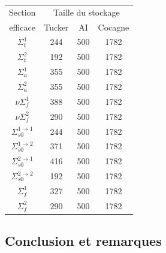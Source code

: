 \begin{center}
\begin{table}
\begin{tabular}{|*{4}{c|}}
	\hline
	Section              						& \multicolumn{3}{|c|}{Taille du stockage} 		\\
	\cline{2-4}
	efficace				 								& Tucker  			& AI 					 	& Cocagne 		\\
	\hline
	$\Sigma_t^1$ 			 							& 244 						& 500 		 		& 	1782			\\
	\hline
	$\Sigma_t^2$ 			 							& 192 						& 500 		 		& 	1782			\\
	\hline
	$\Sigma_a^1$ 			 							& 355 						& 500 		 		& 	1782			\\
	\hline
	$\Sigma_a^2$ 			 							& 355 						& 500 		 		& 	1782			\\
	\hline
	$\nu \Sigma_f^1$ 			 					& 388 						& 500 		 		& 	1782			\\
	\hline
	$\nu \Sigma_f^2$ 			 					& 290 						& 500 		 		& 	1782			\\
	\hline
	$\Sigma_{s0}^{1\rightarrow1}$ 	& 244 						& 500 		 		& 	1782			\\
	\hline
	$\Sigma_{s0}^{1\rightarrow2}$		& 371 						& 500 		 		& 	1782			\\
	\hline
	$\Sigma_{s0}^{2\rightarrow1}$ 	& 416 						& 500 		 		& 	1782			\\
	\hline
	$\Sigma_{s0}^{2\rightarrow2}$		& 192 						& 500 		 		& 	1782			\\
	\hline
	$\Sigma_f^1$ 			 							& 327 						& 500 		 		& 	1782			\\
	\hline
	$\Sigma_f^2$ 			 							& 290 						& 500 		 		& 	1782			\\
	\hline
\end{tabular}
\label{table:stockage}
\end{table}
\end{center}
\subsection{Conclusion et remarques}
\newpage
